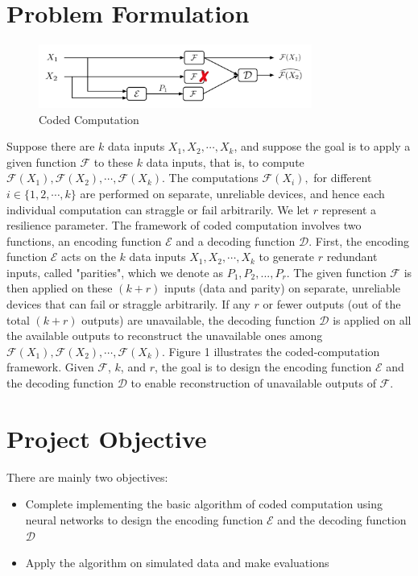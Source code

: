 \documentclass{article}
\begin{document}
        \section{Problem Formulation} 
            \begin{figure}[H]
              \centering
              \includegraphics[width=0.8\textwidth]{./pf.png}
              \caption{Coded Computation}
            \end{figure}  
            
        Suppose there are $k$ data inputs $X_1, X_2, \cdots, X_k$, and suppose the goal is to apply a given function $\mathcal{F}$ to these $k$ data inputs, that is, to compute $\mathcal{F}(X_1),\mathcal{F}(X_2), \cdots, \mathcal{F}(X_k)$. The computations $\mathcal{F}(X_i),$ for different $i \in \{1,2,\cdots, k\}$ are performed on separate, unreliable devices, and hence each individual computation can straggle or fail arbitrarily. We let $r$ represent a resilience parameter. The framework of coded computation involves two functions, an encoding function $\mathcal{E}$ and a decoding function $\mathcal{D}$. First, the encoding function $\mathcal{E}$ acts on the $k$ data inputs $X_1, X_2, \cdots, X_k$ to generate $r$ redundant inputs, called "parities", which we denote as $P_1,P_2,...,P_r$. The given function $\mathcal{F}$ is then applied on these $(k + r)$ inputs (data and parity) on separate, unreliable devices that can fail or straggle arbitrarily. If any $r$ or fewer outputs (out of the total $(k + r)$ outputs) are unavailable, the decoding function $\mathcal{D}$ is applied on all the available outputs to reconstruct the unavailable ones among $\mathcal{F}(X_1),\mathcal{F}(X_2), \cdots, \mathcal{F}(X_k)$. Figure 1 illustrates the coded-computation framework. Given $\mathcal{F}$, $k$, and $r$, the goal is to design the encoding function $\mathcal{E}$ and the decoding function $\mathcal{D}$ to enable reconstruction of unavailable outputs of $\mathcal{F}$.
        
        \section{Project Objective}
        There are mainly two objectives:
        \begin{itemize}
            \item Complete implementing the basic algorithm of coded computation using neural networks to design the encoding function $\mathcal{E}$ and the decoding function $\mathcal{D}$
            \item Apply the algorithm on simulated data and make evaluations 
        \end{itemize}
\end{document}
